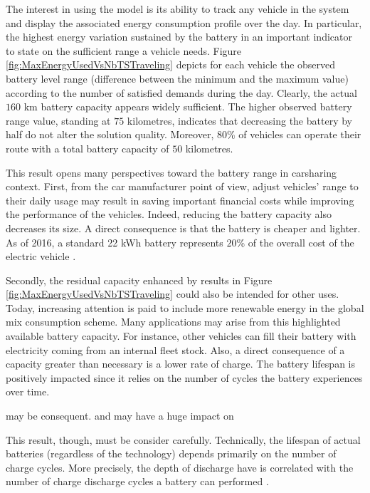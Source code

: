 \begin{bibunit}[ieeetr]
\bigskip
The interest in using the {\ENERGY} model is its ability to track any vehicle in the system and display the associated energy consumption profile over the day.
In particular, the highest energy variation sustained by the battery in an important indicator to state on the sufficient range a vehicle needs.
Figure \ref{fig:MaxEnergyUsedVsNbTSTraveling} depicts for each vehicle the observed battery level range (difference between the minimum and the maximum value) according to the number of satisfied demands during the day.
Clearly, the actual $160$ km battery capacity appears widely sufficient.
The higher observed battery range value, standing at $75$ kilometres, indicates that decreasing the battery by half do not alter the solution quality.
Moreover, $80$\% of vehicles can operate their route with a total battery capacity of $50$ kilometres.

\medskip
This result opens many perspectives toward the battery range in carsharing context.
First, from the car manufacturer point of view, adjust vehicles' range to their daily usage may result in saving important financial costs while improving the performance of the vehicles.
Indeed, reducing the battery capacity also decreases its size.
A direct consequence is that the battery is cheaper and lighter.
As of 2016, a standard 22 kWh battery represents $20$\% of the overall cost of the electric vehicle \cite{avem_prixEVs}.

Secondly, the residual capacity enhanced by results in Figure \ref{fig:MaxEnergyUsedVsNbTSTraveling} could also be intended for other uses.
Today, increasing attention is paid to include more renewable energy in the global mix consumption  scheme.
Many applications may arise from this highlighted available battery capacity.
For instance, other vehicles can fill their battery with electricity coming from an internal fleet stock.
Also, a direct consequence of a capacity greater than necessary is a lower rate of charge.
The battery lifespan is positively impacted since it relies on the number of cycles the battery experiences over time.




  may be consequent.
 and may have a huge impact on 

This result, though, must be consider carefully.
Technically, the lifespan of actual batteries (regardless of the technology) depends primarily on the number of charge cycles.
More precisely, the depth of discharge have is correlated with the number of charge discharge cycles a battery can performed \cite{}.


\end{bibunit}
